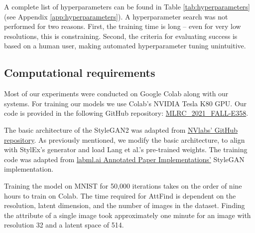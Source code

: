 A complete list of hyperparameters can be found in Table \ref{tab:hyperparameters} (see Appendix \ref{app:hyperparameters}).
A hyperparameter search was not performed for two reasons. First, the training time is long -- even for very low resolutions, this is constraining. Second, the criteria for evaluating success is based on a human user, making automated hyperparameter tuning unintuitive.





\subsection{Computational requirements}

Most of our experiments were conducted on Google Colab along with our systems. For training our models we use Colab's NVIDIA Tesla K80 GPU. Our code is provided in the following GitHub repository: \href{ https://anonymous.4open.science/r/MLRC_2021_FALL-E358/README.md}{MLRC\_2021\_FALL-E358}.

The basic architecture of the StyleGAN2 was adapted from \href{https://github.com/NVlabs/stylegan2-ada-pytorch} {NVlabs' GitHub repository}. As previously mentioned, we modify the basic architecture, to align with StylEx's generator and load Lang et al.'s pre-trained weights. The training code was adapted from \href{https://nn.labml.ai/gan/stylegan/index.html} {labml.ai Annotated Paper Implementations'} StyleGAN implementation.

Training the model on MNIST for 50,000 iterations takes on the order of nine hours to train on Colab. The time required for AttFind is dependent on the resolution, latent dimension, and the number of images in the dataset. Finding the attribute of a single image took approximately one minute for an image with resolution 32 and a latent space of 514.

